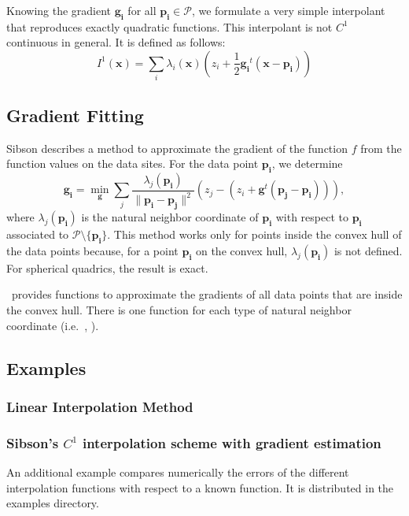 Knowing the gradient $\mathbf{g_i}$ for all $\mathbf{p_i} \in
\mathcal{P}$, we formulate a very simple interpolant that reproduces
exactly quadratic functions. This interpolant is not $C^1$ continuous
in general.  It is defined as follows:
\begin{displaymath}
  I^1(\mathbf{x}) = \sum_i \lambda_i(\mathbf{x}) 
  (z_i + \frac{1}{2} \mathbf{g_i}^t (\mathbf{x} - \mathbf{p_i}))  
\end{displaymath} 



\subsection{Gradient Fitting} \label{s:gradient_fitting}
Sibson describes a method to approximate the gradient of the function
$f$ from the function values on the data sites. For the data point
$\mathbf{p_i}$, we determine
$$\mathbf{g_i} 
= \min_{\mathbf{g}} 
\sum_j
\frac{\lambda_j(\mathbf{p_i})}{\|\mathbf{p_i} - \mathbf{p_j}\|^2}
\left( z_j - (z_i + \mathbf{g}^t (\mathbf{p_j} -\mathbf{p_i})) \right),
$$
where $\lambda_j(\mathbf{p_i})$ is the natural neighbor coordinate
of $\mathbf{p_i}$ with respect to $\mathbf{p_i}$ associated to
$\mathcal{P} \setminus \{\mathbf{p_i}\}$. This method works only for
points inside the convex hull of the data points because, for a point
$\mathbf{p_i}$ on the convex hull, $\lambda_j(\mathbf{p_i})$ is not
defined. For spherical quadrics, the result is exact.

\cgal\ provides functions to approximate the gradients of all data
points that are inside the convex hull. There is one function for each
type of natural neighbor coordinate (i.e.\ , ).


\subsection{Examples}\label{subsec:interpol_examples}
\subsubsection{Linear Interpolation Method}

\subsubsection{Sibson's $C^1$ interpolation scheme with gradient estimation}

An additional example compares numerically the errors of the different 
interpolation functions with respect to a known function. 
It is distributed in the examples directory.

